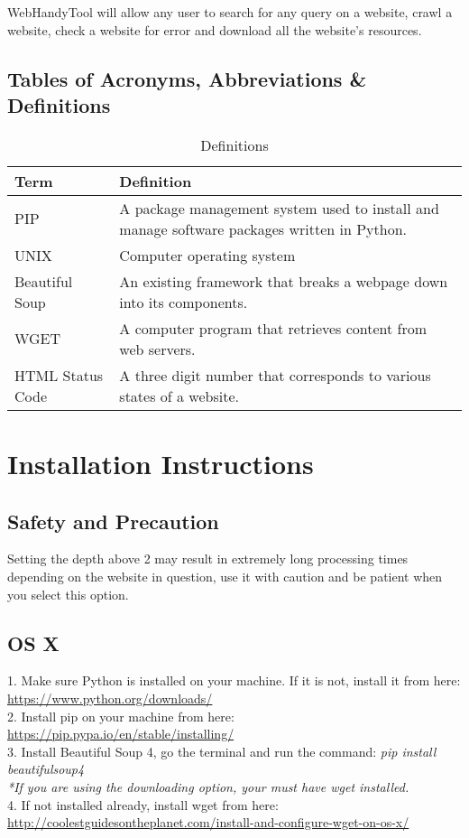 \documentclass[12pt, titlepage]{article}
\begin{document}
WebHandyTool will allow any user to search for any query on a website, crawl a website, check a website for error and download all the website's resources.

\subsection{Tables of Acronyms, Abbreviations \& Definitions}

\begin{table}[h!]
\centering
\begin{tabular}{| p{3cm} | p{10cm} |}    \hline
	Term &Definition\\ \hline
	PIP & A package management system used to install and manage software packages written in Python.\\ \hline
	UNIX &Computer operating system\\ \hline
	Beautiful Soup & An existing framework that breaks a webpage down into its components.\\ \hline
	WGET & A computer program that retrieves content from web servers.\\ \hline
	HTML Status Code & A three digit number that corresponds to various states of a website.\\ \hline
\end{tabular}
\caption{Definitions}
\label{table:Definitions}
\end{table}


\pagebreak

\section{Installation Instructions}

\subsection{Safety and Precaution}
Setting the depth above 2 may result in extremely long processing times depending on the website in question, use it with caution and be patient when you select this option.

\subsection{OS X}
1. Make sure Python is installed on your machine. If it is not, install it from here: \url{https://www.python.org/downloads/}\\
2. Install pip on your machine from here: \url{https://pip.pypa.io/en/stable/installing/}\\
3. Install Beautiful Soup 4, go the terminal and run the command: \textit{pip install beautifulsoup4}\\
\textit{*If you are using the downloading option, your must have wget installed.}\\
4. If not installed already, install wget from here: \url{http://coolestguidesontheplanet.com/install-and-configure-wget-on-os-x/}\\
\end{document}

